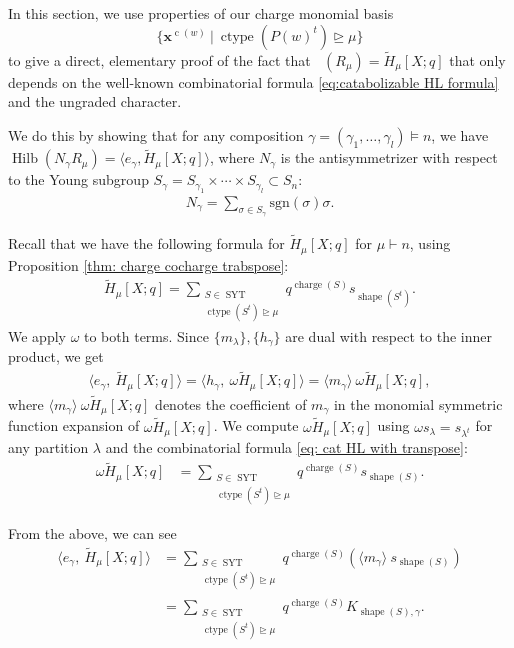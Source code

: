 \documentclass[ALCO, Unicode]{cedram}
\DeclareMathOperator{\charge}{charge}
\DeclareMathOperator{\syt}{SYT}
\DeclareMathOperator{\ctype}{ctype}
\DeclareMathOperator{\Frob}{Frob}
\DeclareMathOperator{\Hilb}{Hilb}
\DeclareMathOperator{\shape}{shape}
\DeclareMathOperator{\cw}{c}
\DeclareMathOperator{\Frobq}{\Frob_q}
\newcommand{\mHL}{\tilde{H}}
\begin{document}
In this section, we use properties of our charge monomial basis \[\{\mathbf{x}^{\cw(w)} \ | \ \ctype(P(w)^t)\unrhd \mu\}\] to give a direct, elementary proof of the fact that $\Frobq (R_{\mu}) = \mHL_{\mu}[X;q]$ that only depends on the well-known combinatorial formula \eqref{eq:catabolizable HL formula} and the ungraded character.

We do this by showing that for any composition $\gamma = (\gamma_1,\dots, \gamma_l)\models n$, we have $\Hilb(N_\gamma R_{\mu}) = \langle e_\gamma , \mHL_{\mu}[X;q]\rangle$, where $N_\gamma$ is the antisymmetrizer with respect to the Young subgroup $S_\gamma = S_{\gamma_1}\times \cdots\times  S_{\gamma_l} \subset S_n$:  
\begin{align*}
    N_\gamma = \sum\limits_{\sigma\in S_\gamma} \text{sgn}(\sigma)\sigma.
\end{align*}

Recall that we have the following formula for  $\mHL_{\mu}[X;q]$ for $\mu\vdash n$, using Proposition \ref{thm: charge cocharge trabspose}:
\begin{align}\label{eq: cat HL with transpose}
\mHL_{\mu}[X;q] =  \sum\limits_{\substack{S\in \syt\\  \ctype(S^t)\unrhd\mu}}  q^{\charge(S)} s_{\shape(S^t)}.
\end{align}
We apply $\omega$ to both terms. Since $\{m_\lambda\}, \{h_\gamma\}$ are dual with respect to the inner product, we get
\begin{align*}
     \langle e_{\gamma},\  \mHL_{\mu}  [X;q] \rangle =  \langle h_{\gamma},\  \omega \mHL_{\mu} [X;q] \rangle = \langle m_\gamma\rangle  \ \omega \mHL_{\mu} [X;q] , 
\end{align*}
where $\langle m_\gamma\rangle  \ \omega \mHL_{\mu} [X;q] $ denotes the coefficient of $m_\gamma$ in the monomial symmetric function expansion of $\omega \mHL_{\mu} [X;q] $.
We compute $\omega \mHL_{\mu} [X;q] $ using $\omega s_\lambda = s_{\lambda^t}$ for any partition $\lambda$ and the combinatorial formula \eqref{eq: cat HL with transpose}:
\begin{align*}
    \omega \mHL_{\mu} [X;q]   &= \sum\limits_{\substack{S\in \syt\\  \ctype(S^t)\unrhd\mu}}  q^{\charge(S)}s_{\shape(S)}  .
\end{align*}

From the above, we can see
\begin{align*}
    \langle e_{\gamma},\  \mHL_{\mu}  [X;q] \rangle &=  \sum\limits_{\substack{S \in \syt\\  \ctype(S^t)\unrhd\mu}}  q^{\charge(S)} \left(\langle m_\gamma \rangle \   s_{\shape(S)} \right) \\&= \sum\limits_{\substack{S\in \syt\\  \ctype(S^t)\unrhd\mu}}  q^{\charge(S)}   K_{\shape(S),\gamma}.
\end{align*}
\end{document}

